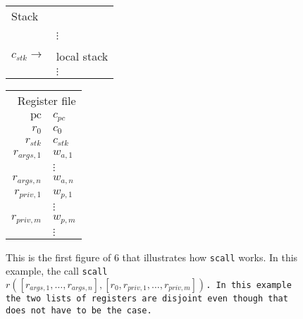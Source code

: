 \documentclass[a4paper]{article}
\newcommand{\var}[1]{\mathit{#1}}
\newcommand{\pc}{\mathit{pc}}
\newcommand{\pcreg}{\mathrm{pc}}
\begin{document}
              \begin{figure}
                \label{fig:stack-before-call}
                \centering
                \begin{tabular}[!h]{r | >{\raggedright\arraybackslash}p{3cm} |}
                  \multicolumn{2}{l}{Stack} \\
                  \cline{2-2}
               & \\
               & $\vdots$\\
                  \cline{2-2}
               & 0 \\
                  \cline{2-2}
                  $c_{\var{stk}} \rightarrow$   & local stack\\
               & $\vdots$\\
                  \cline{2-2}
                \end{tabular}
                \hspace{1cm}
                \begin{tabular}{r | >{\centering\arraybackslash}p{0.75cm} |}
                  \multicolumn{2}{r}{Register file} \\
                  \cline{2-2}
                  $\pcreg$ & $c_{\pc}$\\
                  \cline{2-2}
                  $r_0$  & $c_0$ \\
                  \cline{2-2}
                  $r_{\var{stk}}$  & $c_{\var{stk}}$ \\
                  \cline{2-2}
                  $r_{\var{args},1}$ & $w_{a,1}$ \\
                  \cline{2-2}
                           & $\vdots$ \\
                  \cline{2-2}
                  $r_{\var{args},n}$ & $w_{a,n}$\\
                  \cline{2-2}
                  $r_{\var{priv},1}$ & $w_{p,1}$\\
                  \cline{2-2}
                           & $\vdots$ \\
                  \cline{2-2}
                  $r_{\var{priv},m}$ & $w_{p,m}$\\
                  \cline{2-2}
                           & $\vdots$ \\
                  \cline{2-2}
                \end{tabular}
                \caption{This is the first figure of 6 that illustrates how \texttt{scall} works. In this example, the call \texttt{scall $r([r_{\var{args},1},\dots,r_{\var{args},n}],[r_0,r_{\var{priv},1},\dots,r_{\var{priv},m}])$. In this example the two lists of registers are disjoint even though that does not have to be the case.}}
              \end{figure}
\end{document}
